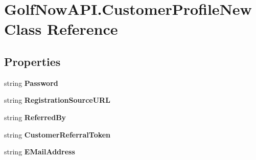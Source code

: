 \hypertarget{class_golf_now_a_p_i_1_1_customer_profile_new}{}\section{Golf\+Now\+A\+P\+I.\+Customer\+Profile\+New Class Reference}
\label{class_golf_now_a_p_i_1_1_customer_profile_new}
\subsection*{Properties}
\begin{DoxyCompactItemize}
\item 
\mbox{\label{class_golf_now_a_p_i_1_1_customer_profile_new_ad6ffe469a6e48707500cda9682fc8f43}} 
string {\bfseries Password}
\item 
\mbox{\label{class_golf_now_a_p_i_1_1_customer_profile_new_a74a749bdd9e964cb34ba8743a015b564}} 
string {\bfseries Registration\+Source\+U\+RL}
\item 
\mbox{\label{class_golf_now_a_p_i_1_1_customer_profile_new_a170fdb03025be5b85d33cfb447f65f76}} 
string {\bfseries Referred\+By}
\item 
\mbox{\label{class_golf_now_a_p_i_1_1_customer_profile_new_a79635330f4d785abc6df1b2e768735ed}} 
string {\bfseries Customer\+Referral\+Token}
\item 
\mbox{\label{class_golf_now_a_p_i_1_1_customer_profile_new_a75cc5bf2195144b27ceffc068ef89150}} 
string {\bfseries E\+Mail\+Address}
\item 
\mbox{\label{class_golf_now_a_p_i_1_1_customer_profile_new_a19035730654e36b0533416453042f056}} 

\end{DoxyCompactItemize}
